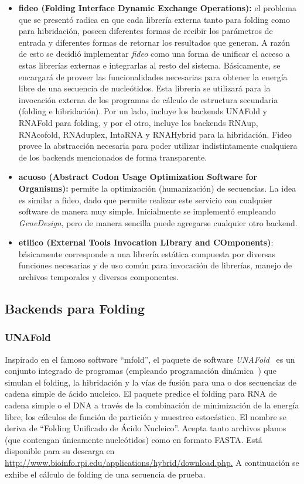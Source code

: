 \begin{itemize}
	\item \textbf{fideo (Folding Interface Dynamic Exchange Operations): } el problema que se presentó radica en que cada librería externa tanto para folding como para hibridación, poseen diferentes formas de recibir los parámetros de entrada y diferentes formas de retornar los resultados que generan. A razón de esto se decidió implementar \emph{fideo} como una forma de unificar el acceso a estas librerías externas e integrarlas al resto del sistema. Básicamente, se encargará de proveer las funcionalidades necesarias para obtener la energía libre de una secuencia de nucleótidos. Esta librería se utilizará para la invocación externa de los programas de cálculo de estructura secundaria (folding e hibridación). Por un lado, incluye los backends UNAFold y RNAFold para folding, y por el otro, incluye los backends RNAup, RNAcofold, RNAduplex, IntaRNA y RNAHybrid para la hibridación. Fideo provee la abstracción necesaria para poder utilizar indistintamente cualquiera de los backends mencionados de forma transparente.

	\item \textbf{acuoso (Abstract Codon Usage Optimization Software for Organisms): } permite la optimización (humanización) de secuencias. La idea es similar a fideo, dado que permite realizar este servicio con cualquier software de manera muy simple. Inicialmente se implementó empleando \emph{GeneDesign}, pero de manera sencilla puede agregarse cualquier otro backend.

	\item \textbf{etilico (External Tools Invocation LIbrary and COmponents)}: básicamente corresponde a una librería estática compuesta por diversas funciones necesarias y de uso común para invocación de librerías, manejo de archivos temporales y diversos componentes.
\end{itemize}

\subsection{Backends para Folding}

\subsubsection{UNAFold}
\label{unafold}
\par Inspirado en el famoso software ``mfold'', el paquete de software \emph{UNAFold}~\cite{unafold} es un conjunto integrado de programas (empleando programación dinámica~\cite{ProgDinaminca}) que simulan el folding, la hibridación y la vías de fusión para una o dos secuencias de cadena simple de ácido nucleico. El paquete predice el folding para RNA de cadena simple o el DNA a través de la combinación de minimización de la energía libre, los cálculos de función de partición y muestreo estocástico. El nombre se deriva de ``Folding Unificado de Ácido Nucleico''. Acepta tanto archivos planos (que contengan únicamente nucleótidos) como en formato FASTA. Está disponible para su descarga en \url{http://www.bioinfo.rpi.edu/applications/hybrid/download.php.}
A continuación se exhibe el cálculo de folding de una secuencia de prueba.

